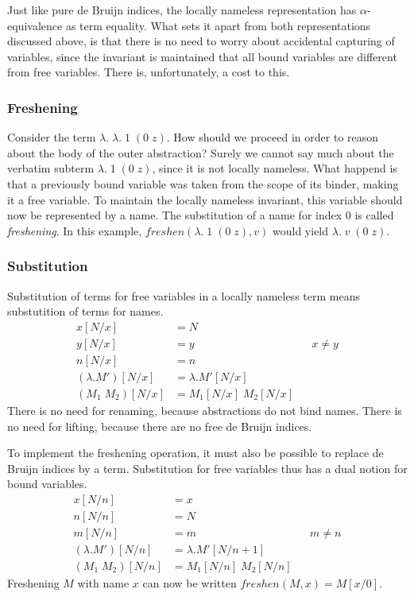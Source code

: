 \documentclass[a4paper,11pt]{article}
\begin{document}
Just like pure de Bruijn indices, the locally nameless representation
has $\alpha$-equivalence as term equality.
What sets it apart from both representations discussed above, is that
there is no need to worry about accidental capturing of variables,
since the invariant is maintained that all bound variables are
different from free variables.
There is, unfortunately, a cost to this.

\subsubsection*{Freshening}

Consider the term $\lambda . \; \lambda . \; 1 \; (0 \; z)$.
How should we proceed in order to reason about the body of the outer
abstraction?
Surely we cannot say much about the verbatim subterm
$\lambda . \; 1 \; (0 \; z)$, since it is not locally nameless.
What happend is that a previously bound variable was taken from the
scope of its binder, making it a free variable.
To maintain the locally nameless invariant, this variable should now be
represented by a name.
The substitution of a name for index $0$ is called {\em freshening}.
In this example, $\mathit{freshen}(\lambda . \; 1 \; (0 \; z), v)$ would yield
$\lambda . \; v \; (0 \; z)$.

\subsubsection*{Substitution}

Substitution of terms for free variables in a locally nameless term
means substutition of terms for names.
\begin{align*}
  x[N/x]             &= N\\
  y[N/x]             &= y                 && \text{$x \neq y$} \\
  n[N/x]             &= n\\
  (\lambda .M')[N/x] &= \lambda .M'[N/x]\\
  (M_1 \; M_2)[N/x]  &= M_1[N/x] \; M_2[N/x]
\end{align*}
There is no need for renaming, because abstractions do not bind names.
There is no need for lifting, because there are no free de Bruijn
indices.

To implement the freshening operation, it must also be possible to
replace de Bruijn indices by a term.
Substitution for free variables thus has a dual notion for bound
variables.
\begin{align*}
  x[N/n]             &= x\\
  n[N/n]             &= N\\
  m[N/n]             &= m                    && \text{$m \neq n$} \\
  (\lambda .M')[N/n] &= \lambda .M'[N / n\!+\!1]\\
  (M_1 \; M_2)[N/n]  &= M_1[N/n] \; M_2[N/n]
\end{align*}
Freshening $M$ with name $x$ can now be written
$\mathit{freshen}(M, x) = M[x/0]$.
\end{document}
